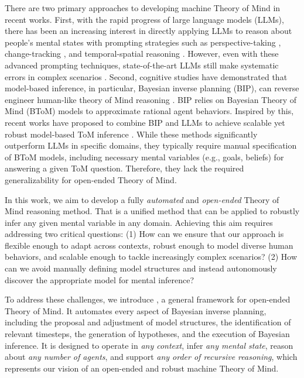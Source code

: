 There are two primary approaches to developing machine Theory of Mind in recent works. First, with the rapid progress of large language models (LLMs), there has been an increasing interest in directly applying LLMs to reason about people's mental states with prompting strategies such as perspective-taking \citep{wilf2023think, sclar2023minding, jung2024perceptions}, change-tracking \citep{huang2024notion}, and temporal-spatial reasoning \citep{hou2024timetom}. However, even with these advanced prompting techniques, state-of-the-art LLMs still make systematic errors in complex scenarios \citep{jin2024mmtom}. Second, cognitive studies have demonstrated that model-based inference, in particular, Bayesian inverse planning (BIP), can reverse engineer human-like theory of Mind reasoning \cite{baker2009action, ullman2009help, baker2017rational, zhi2020online}. BIP relies on Bayesian Theory of Mind (BToM) models \cite{baker2017rational} to approximate rational agent behaviors. Inspired by this, recent works have proposed to combine BIP and LLMs to achieve scalable yet robust model-based ToM inference \citep{jin2024mmtom, shi2024muma}. While these methods significantly outperform LLMs in specific domains, they typically require manual specification of BToM models, including necessary mental variables (e.g., goals, beliefs) for answering a given ToM question. Therefore, they lack the required generalizability for open-ended Theory of Mind.


In this work, we aim to develop a fully \textit{automated} and \textit{open-ended} Theory of Mind reasoning method. That is a unified method that can be applied to robustly infer any given mental variable in any domain. Achieving this aim requires addressing two critical questions: (1) How can we ensure that our approach is flexible enough to adapt across contexts, robust enough to model diverse human behaviors, and scalable enough to tackle increasingly complex scenarios? (2) How can we avoid manually defining model structures and instead autonomously discover the appropriate model for mental inference?


To address these challenges, we introduce \ours, a general framework for open-ended Theory of Mind. It automates every aspect of Bayesian inverse planning, including the proposal and adjustment of model structures, the identification of relevant timesteps, the generation of hypotheses, and the execution of Bayesian inference. It is designed to operate in \textit{any context}, infer \textit{any mental state}, reason about \textit{any number of agents}, and support \textit{any order of recursive reasoning}, which represents our vision of an open-ended and robust machine Theory of Mind.

